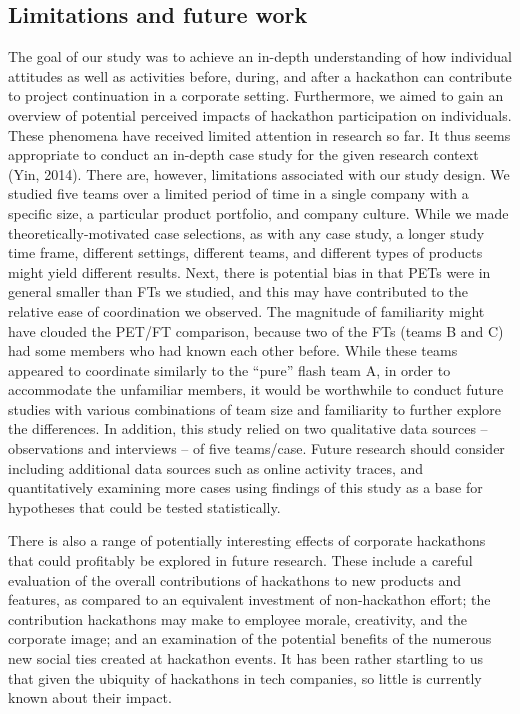 \documentclass{hcij}
\begin{document}
\subsection{Limitations and future work}
The goal of our study was to achieve an in-depth understanding of how individual attitudes as well as activities before, during, and after a hackathon can contribute to project continuation in a corporate setting. Furthermore, we aimed to gain an overview of potential perceived impacts of hackathon participation on individuals. These phenomena have received limited attention in research so far. It thus seems appropriate to conduct an in-depth case study for the given research context (Yin, 2014). There are, however, limitations associated with our study design. We studied five teams over a limited period of time in a single company with a specific size, a particular product portfolio, and company culture. While we made theoretically-motivated case selections, as with any case study, a longer study time frame, different settings, different teams, and different types of products might yield different results. Next, there is potential bias in that PETs were in general smaller than FTs we studied, and this may have contributed to the relative ease of coordination we observed. The magnitude of familiarity might have clouded the PET/FT comparison, because two of the FTs (teams B and C) had some members who had known each other before. While these teams appeared to coordinate similarly to the “pure” flash team A, in order to accommodate the unfamiliar members, it would be worthwhile to conduct future studies with various combinations of team size and familiarity to further explore the differences. In addition, this study relied on two qualitative data sources –observations and interviews – of five teams/case. Future research should consider including additional data sources such as online activity traces, and quantitatively examining more cases using findings of this study as a base for hypotheses that could be tested statistically.

There is also a range of potentially interesting effects of corporate hackathons that could profitably be explored in future research. These include a careful evaluation of the overall contributions of hackathons to new products and features, as compared to an equivalent investment of non-hackathon effort; the contribution hackathons may make to employee morale, creativity, and the corporate image; and an examination of the potential benefits of the numerous new social ties created at hackathon events. It has been rather startling to us that given the ubiquity of hackathons in tech companies, so little is currently known about their impact.
\end{document}
